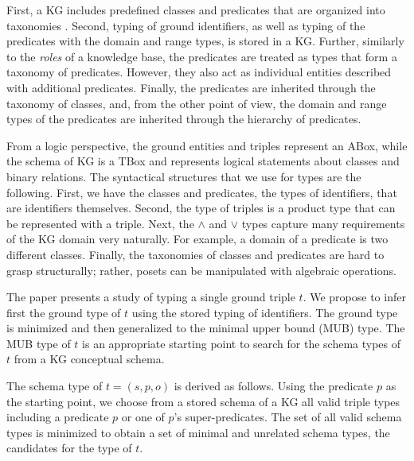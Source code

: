 \documentclass[runningheads]{llncs}
\newcommand{\memo}[1]{}
\begin{document}
First, a KG includes predefined classes and predicates that are
organized into taxonomies \cite{Baader2002}. Second, typing of ground
identifiers, as well as typing of the predicates with the domain and
range types, is stored in a KG. Further, similarly to the \emph{roles}
\cite{Brachman1985} of a knowledge base, the predicates are treated as
types that form a taxonomy of predicates. However, they also act as
individual entities described with additional predicates. Finally, the
predicates are inherited through the taxonomy of classes, and, from
the other point of view, the domain and range types of the predicates
are inherited through the hierarchy of predicates.

\memo{
Typing a knowledge graph requires a framework for the definition of
rules, which is different from the framework for classical typing of
programming languages. While typing in programming languages is based
on the syntactical composition of a program, a knowledge graph is
built from simple triples. Triples can form rich semantic structures
depending on the kinds of entities and values. The kind of object,
for example, can be either a ground value or a class. Typing of a KG
must, therefore, be able to grasp the kinds of objects in the rules,
and, in many cases, need to be guided by a procedure.}

From a logic perspective, the ground entities and triples represent an
ABox, while the schema of KG is a TBox and represents logical
statements about classes and binary relations. The syntactical
structures that we use for types are the following. First, we have the
classes and predicates, the types of identifiers, that are identifiers
themselves. Second, the type of triples is a product type that can be
represented with a triple. Next, the $\land$ and $\lor$ types capture
many requirements of the KG domain very naturally. For example, a
domain of a predicate is two different classes. Finally, the
taxonomies of classes and predicates are hard to grasp structurally;
rather, posets can be manipulated with algebraic operations.

The paper presents a study of typing a single ground triple $t$. We
propose to infer first the ground type of $t$ using the stored typing
of identifiers. The ground type is minimized and then generalized to
the minimal upper bound (MUB) type. The MUB type of $t$ is an
appropriate starting point to search for the schema types of $t$ from
a KG conceptual schema.

The schema type of $t=(s,p,o)$ is derived as follows. Using the
predicate $p$ as the starting point, we choose from a stored schema of
a KG all valid triple types including a predicate $p$ or one of $p$'s
super-predicates. The set of all valid schema types is minimized to
obtain a set of minimal and unrelated schema types, the candidates for
the type of $t$.
\end{document}
